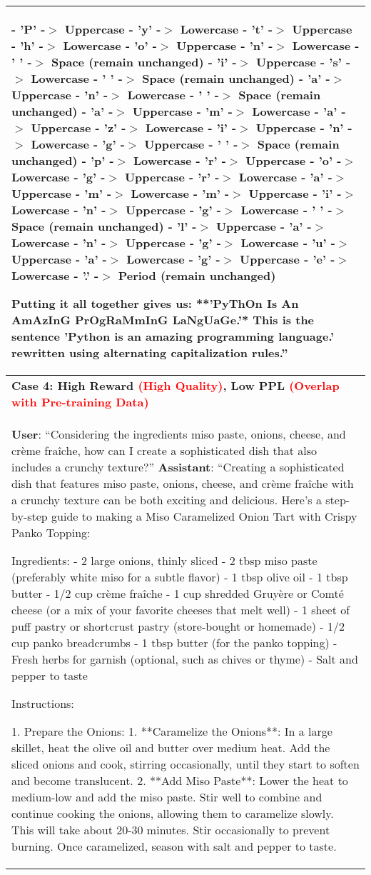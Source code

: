 \begin{table}[htbp]
{\begin{tabular}{|p{}|}
- 'P' -$>$ Uppercase
- 'y' -$>$ Lowercase
- 't' -$>$ Uppercase
- 'h' -$>$ Lowercase
- 'o' -$>$ Uppercase
- 'n' -$>$ Lowercase
- ' ' -$>$ Space (remain unchanged)
- 'i' -$>$ Uppercase
- 's' -$>$ Lowercase
- ' ' -$>$ Space (remain unchanged)
- 'a' -$>$ Uppercase
- 'n' -$>$ Lowercase
- ' ' -$>$ Space (remain unchanged)
- 'a' -$>$ Uppercase
- 'm' -$>$ Lowercase
- 'a' -$>$ Uppercase
- 'z' -$>$ Lowercase
- 'i' -$>$ Uppercase
- 'n' -$>$ Lowercase
- 'g' -$>$ Uppercase
- ' ' -$>$ Space (remain unchanged)
- 'p' -$>$ Lowercase
- 'r' -$>$ Uppercase
- 'o' -$>$ Lowercase
- 'g' -$>$ Uppercase
- 'r' -$>$ Lowercase
- 'a' -$>$ Uppercase
- 'm' -$>$ Lowercase
- 'm' -$>$ Uppercase
- 'i' -$>$ Lowercase
- 'n' -$>$ Uppercase
- 'g' -$>$ Lowercase
- ' ' -$>$ Space (remain unchanged)
- 'l' -$>$ Uppercase
- 'a' -$>$ Lowercase
- 'n' -$>$ Uppercase
- 'g' -$>$ Lowercase
- 'u' -$>$ Uppercase
- 'a' -$>$ Lowercase
- 'g' -$>$ Uppercase
- 'e' -$>$ Lowercase
- '.' -$>$ Period (remain unchanged)

Putting it all together gives us: **'PyThOn Is An AmAzInG PrOgRaMmInG LaNgUaGe.'*
This is the sentence 'Python is an amazing programming language.' rewritten using alternating capitalization rules.'' \\
    \hline
    \textbf{Case 4: High Reward \textcolor{red}{(High Quality)}, Low PPL \textcolor{red}{(Overlap with Pre-training Data)}} \\
    \textbf{User}: ``Considering the ingredients miso paste, onions, cheese, and crème fraîche, how can I create a sophisticated dish that also includes a crunchy texture?'' \newline
    \textbf{Assistant}: ``Creating a sophisticated dish that features miso paste, onions, cheese, and crème fraîche with a crunchy texture can be both exciting and delicious. Here's a step-by-step guide to making a Miso Caramelized Onion Tart with Crispy Panko Topping:

 Ingredients:
- 2 large onions, thinly sliced
- 2 tbsp miso paste (preferably white miso for a subtle flavor)
- 1 tbsp olive oil
- 1 tbsp butter
- 1/2 cup crème fraîche
- 1 cup shredded Gruyère or Comté cheese (or a mix of your favorite cheeses that melt well)
- 1 sheet of puff pastry or shortcrust pastry (store-bought or homemade)
- 1/2 cup panko breadcrumbs
- 1 tbsp butter (for the panko topping)
- Fresh herbs for garnish (optional, such as chives or thyme)
- Salt and pepper to taste

 Instructions:

 1. Prepare the Onions:
1. **Caramelize the Onions**: In a large skillet, heat the olive oil and butter over medium heat. Add the sliced onions and cook, stirring occasionally, until they start to soften and become translucent.
2. **Add Miso Paste**: Lower the heat to medium-low and add the miso paste. Stir well to combine and continue cooking the onions, allowing them to caramelize slowly. This will take about 20-30 minutes. Stir occasionally to prevent burning. Once caramelized, season with salt and pepper to taste.


\end{tabular}}
\end{table}
